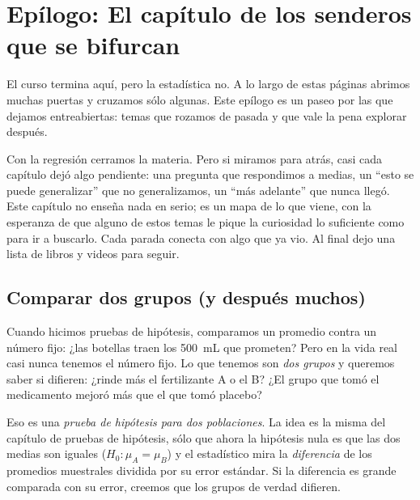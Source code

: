 \chapter{Epílogo: El capítulo de los senderos que se bifurcan}

\begin{ideanote}
El curso termina aquí, pero la estadística no. A lo largo de estas páginas abrimos muchas puertas y cruzamos sólo algunas. Este epílogo es un paseo por las que dejamos entreabiertas: temas que rozamos de pasada y que vale la pena explorar después.
\end{ideanote}

Con la regresión cerramos la materia. Pero si miramos para atrás, casi cada capítulo dejó algo pendiente: una pregunta que respondimos a medias, un \enquote{esto se puede generalizar} que no generalizamos, un \enquote{más adelante} que nunca llegó. Este capítulo no enseña nada en serio; es un mapa de lo que viene, con la esperanza de que alguno de estos temas le pique la curiosidad lo suficiente como para ir a buscarlo. Cada parada conecta con algo que ya vio. Al final dejo una lista de libros y videos para seguir.

\section{Comparar dos grupos (y después muchos)}

Cuando hicimos pruebas de hipótesis, comparamos un promedio contra un número fijo: ¿las botellas traen los \qty{500}{\milli\liter} que prometen? Pero en la vida real casi nunca tenemos el número fijo. Lo que tenemos son \emph{dos grupos} y queremos saber si difieren: ¿rinde más el fertilizante A o el B? ¿El grupo que tomó el medicamento mejoró más que el que tomó placebo?

Eso es una \emph{prueba de hipótesis para dos poblaciones}. La idea es la misma del capítulo de pruebas de hipótesis, sólo que ahora la hipótesis nula es que las dos medias son iguales (\(H_0: \mu_A = \mu_B\)) y el estadístico mira la \emph{diferencia} de los promedios muestrales dividida por su error estándar. Si la diferencia es grande comparada con su error, creemos que los grupos de verdad difieren.

\begin{center}
\end{center}

